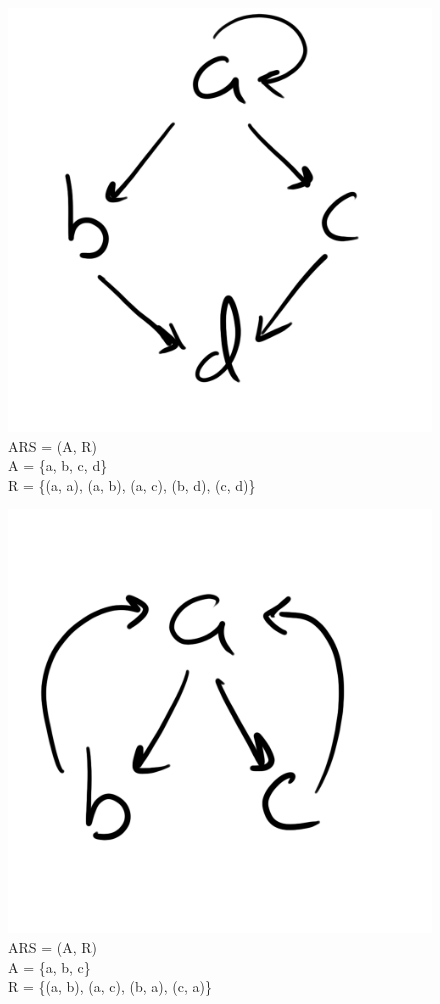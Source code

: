 \documentclass{article}
\begin{document}
{\begin{figure}[h!]
  \centering
  \includegraphics[scale=0.06]{gen15}
  \caption[] {
     ARS = (A, R) \\ A = \{a, b, c, d\} \\ R = \{(a, a), (a, b), (a, c), (b, d), (c, d)\}
    \endtabular}
\end{figure}

\begin{figure}[h!]
  \centering
  \includegraphics[scale=0.06]{gen16}
  \caption[] {
     ARS = (A, R) \\ A = \{a, b, c\} \\ R = \{(a, b), (a, c), (b, a), (c, a)\}
    \endtabular}
\end{figure}


}
\end{document}
